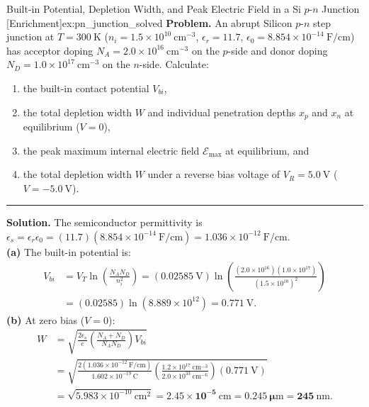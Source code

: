 \documentclass[11pt,a4paper]{article}
\begin{document}
\begin{examplebox}{Built-in Potential, Depletion Width, and Peak Electric Field in a Si $p$-$n$ Junction \textnormal{\color{purple!75!black}[Enrichment]}}{ex:pn_junction_solved}
\textbf{Problem.} An abrupt Silicon $p$-$n$ step junction at $T = 300\ \mathrm{K}$ ($n_i = 1.5\times 10^{10}\ \mathrm{cm^{-3}}$, $\epsilon_r = 11.7$, $\epsilon_0 = 8.854\times 10^{-14}\ \mathrm{F/cm}$) has acceptor doping $N_A = 2.0\times 10^{16}\ \mathrm{cm^{-3}}$ on the $p$-side and donor doping $N_D = 1.0\times 10^{17}\ \mathrm{cm^{-3}}$ on the $n$-side.
Calculate:
\begin{enumerate}[noitemsep]
    \item the built-in contact potential $V_{bi}$,
    \item the total depletion width $W$ and individual penetration depths $x_p$ and $x_n$ at equilibrium ($V = 0$),
    \item the peak maximum internal electric field $\mathcal{E}_{\max}$ at equilibrium, and
    \item the total depletion width $W$ under a reverse bias voltage of $V_R = 5.0\ \mathrm{V}$ ($V = -5.0\ \mathrm{V}$).
\end{enumerate}
\vspace{0.2cm}\hrule\vspace{0.2cm}
\textbf{Solution.}
The semiconductor permittivity is $\epsilon_s = \epsilon_r \epsilon_0 = (11.7)(8.854\times 10^{-14}\ \mathrm{F/cm}) = 1.036\times 10^{-12}\ \mathrm{F/cm}$.\\
\textbf{(a)} The built-in potential is:
\begin{align*}
    V_{bi} &= V_T \ln\left(\frac{N_A N_D}{n_i^2}\right) = (0.02585\ \mathrm{V})\ln\left(\frac{(2.0\times 10^{16})(1.0\times 10^{17})}{(1.5\times 10^{10})^2}\right) \\
           &= (0.02585)\ln(8.889\times 10^{12}) = \mathbf{0.771\ \mathrm{V}}.
\end{align*}
\textbf{(b)} At zero bias ($V = 0$):
\begin{align*}
    W &= \sqrt{\frac{2\epsilon_s}{e}\left(\frac{N_A + N_D}{N_A N_D}\right)V_{bi}} \\
      &= \sqrt{\frac{2(1.036\times 10^{-12}\ \mathrm{F/cm})}{1.602\times 10^{-19}\ \mathrm{C}}\left(\frac{1.2\times 10^{17}\ \mathrm{cm^{-3}}}{2.0\times 10^{33}\ \mathrm{cm^{-6}}}\right)(0.771\ \mathrm{V})} \\
      &= \sqrt{5.983\times 10^{-10}\ \mathrm{cm^2}} = \mathbf{2.45\times 10^{-5}\ \mathrm{cm} = 0.245\ \mu\mathrm{m} = 245\ \mathrm{nm}}.

\end{align*}
\end{examplebox}
\end{document}
